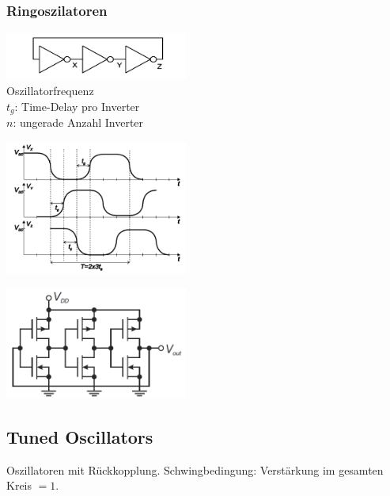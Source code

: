 \subsubsection{Ringoszilatoren}
	\begin{multicols}{3}
	 	\includegraphics[width=6cm]{./bilder/osziRing.png} \\
    Oszillatorfrequenz  \\
    $t_g$: Time-Delay pro Inverter\\
    $n$: ungerade Anzahl Inverter\\
		\columnbreak
		
		\includegraphics[width=6cm]{./bilder/osziRingSignal.png}	
		\columnbreak
		
		\includegraphics[width=6cm]{./bilder/osziRingCMOS.png}
	\end{multicols}
	
\subsection{Tuned Oscillators}
	Oszillatoren mit Rückkopplung. Schwingbedingung: Verstärkung im gesamten Kreis $=1$. 
